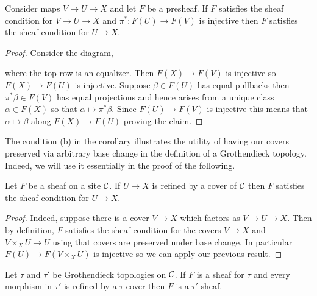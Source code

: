 \documentclass[12pt]{article}
\begin{document}
\begin{lemma}
Consider maps $V \to U \to X$ and let $F$ be a presheaf. If $F$ satisfies the sheaf condition for $V \to U \to X$ and $\pi^* : F(U) \to F(V)$ is injective then $F$ satisfies the sheaf condition for $U \to X$.
\end{lemma}

\begin{proof}
Consider the diagram,
\begin{center}
\end{center}
where the top row is an equalizer. Then $F(X) \to F(V)$ is injective so $F(X) \to F(U)$ is injective. Suppose $\beta \in F(U)$ has equal pullbacks then $\pi^* \beta \in F(V)$ has equal projections and hence arises from a unique class $\alpha \in F(X)$ so that $\alpha \mapsto \pi^* \beta$. Since $F(U) \to F(V)$ is injective this means that $\alpha \mapsto \beta$ along $F(X) \to F(U)$ proving the claim.
\end{proof}

\begin{rmk}
The condition (b) in the corollary illustrates the utility of having our covers preserved via arbitrary base change in the definition of a Grothendieck topology. Indeed, we will use it essentially in the proof of the following.
\end{rmk}

\begin{cor}
Let $F$ be a sheaf on a site $\mathcal{C}$. If $U \to X$ is refined by a cover of $\mathcal{C}$ then $F$ satisfies the sheaf condition for $U \to X$.
\end{cor}

\begin{proof}
Indeed, suppose there is a cover $V \to X$ which factors as $V \to U \to X$. Then by definition, $F$ satisfies the sheaf condition for the covers $V \to X$ and $V \times_X U \to U$ using that covers are preserved under base change. In particular $F(U) \to F(V \times_X U)$ is injective so we can apply our previous result.
\end{proof}

\begin{cor}
Let $\tau$ and $\tau'$ be Grothendieck topologies on $\mathcal{C}$. If $F$ is a sheaf for $\tau$ and every morphism in $\tau'$ is refined by a $\tau$-cover then $F$ is a $\tau'$-sheaf.
\end{cor}
\end{document}
